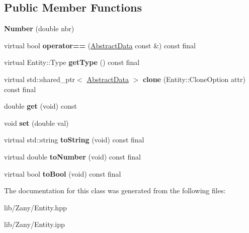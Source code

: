 \subsection*{Public Member Functions}
\begin{DoxyCompactItemize}
\item 
\mbox{\label{classzany_1_1_number_a22ef3f8c569d822aca080ae0dc39d01c}} 
{\bfseries Number} (double nbr)
\item 
\mbox{\label{classzany_1_1_number_a8f735de0ba247401acb706f066ddf47a}} 
virtual bool {\bfseries operator==} (\hyperlink{classzany_1_1_abstract_data}{Abstract\+Data} const \&) const final
\item 
\mbox{\label{classzany_1_1_number_a4872d9c5276a1c8d748d21914504b95e}} 
virtual Entity\+::\+Type {\bfseries get\+Type} () const final
\item 
\mbox{\label{classzany_1_1_number_abe834d3066e54391957ece6df08e68d2}} 
virtual std\+::shared\+\_\+ptr$<$ \hyperlink{classzany_1_1_abstract_data}{Abstract\+Data} $>$ {\bfseries clone} (Entity\+::\+Clone\+Option attr) const final
\item 
\mbox{\label{classzany_1_1_number_a085966a48d7b6fa605bb9547e8b10ee8}} 
double {\bfseries get} (void) const
\item 
\mbox{\label{classzany_1_1_number_a2e283012f41bf55aedb4135c2c281c56}} 
void {\bfseries set} (double val)
\item 
\mbox{\label{classzany_1_1_number_ab42e94979bc6dd63dfc23b25d4dc4b0f}} 
virtual std\+::string {\bfseries to\+String} (void) const final
\item 
\mbox{\label{classzany_1_1_number_a3a6390ca7cc70ba6cea53da59c4e4e4a}} 
virtual double {\bfseries to\+Number} (void) const final
\item 
\mbox{\label{classzany_1_1_number_a20319c25f7ede32a9e29ee8ac6294d3f}} 
virtual bool {\bfseries to\+Bool} (void) const final
\end{DoxyCompactItemize}


The documentation for this class was generated from the following files\+:\begin{DoxyCompactItemize}
\item 
lib/\+Zany/Entity.\+hpp\item 
lib/\+Zany/Entity.\+ipp\end{DoxyCompactItemize}
